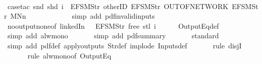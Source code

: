 \begin{isabellebody}
\ \ \ \ \isamarkupfalse%
\ {\isacharparenleft}case{\isacharunderscore}tac\ {\isachardoublequoteopen}{\isacharparenleft}snd\ {\isacharparenleft}shd\ i{\isacharparenright}{\isacharparenright}\ {\isacharequal}\ {\isacharbrackleft}EFSM{\isachardot}Str\ {\isacharprime}{\isacharprime}otherID{\isacharprime}{\isacharprime}{\isacharcomma}\ EFSM{\isachardot}Str\ {\isacharprime}{\isacharprime}OUT{\isacharunderscore}OF{\isacharunderscore}NETWORK{\isacharprime}{\isacharprime}{\isacharcomma}\ EFSM{\isachardot}Str\ {\isacharprime}{\isacharprime}MNn{}{\isacharprime}{\isacharprime}{\isacharbrackright}{\isachardoublequoteclose}{\isacharparenright}\isanewline
\ \ \ \ \ \isamarkupfalse%
\isanewline
\ \ \ \ \ \isamarkupfalse%
\ {\isacharparenleft}simp\ add{\isacharcolon}\ pdf{\isacharunderscore}{}{\isacharunderscore}invalid{\isacharunderscore}inputs{\isacharparenright}\isanewline
\ \ \ \ \isamarkupfalse%
\ no{\isacharunderscore}output{\isacharunderscore}none{\isacharbrackleft}of\ linkedIn\ {\isachardoublequoteopen}{\isacharparenleft}{\isacharless}{\isachargreater}{\isacharparenleft}{}\ {\isacharcolon}{\isacharequal}\ EFSM{\isachardot}Str\ {\isacharprime}{\isacharprime}free{\isacharprime}{\isacharprime}{\isacharparenright}{\isacharparenright}{\isachardoublequoteclose}\ {\isachardoublequoteopen}{\isacharparenleft}stl\ i{\isacharparenright}{\isachardoublequoteclose}{\isacharbrackright}\isanewline
\ \ \ \ \isamarkupfalse%
\ OutputEq{\isacharunderscore}def\isanewline
\ \ \ \ \ \isamarkupfalse%
\ {\isacharparenleft}simp\ add{\isacharcolon}\ alw{\isacharunderscore}mono{\isacharparenright}\isanewline
\ \ \ \ \ \isamarkupfalse%
\ {\isacharparenleft}simp\ add{\isacharcolon}\ pdf{\isacharunderscore}summary{\isacharparenright}\isanewline
\ \ \ \ \ \isamarkupfalse%
\ standard\isanewline
\ \ \ \ \ \isamarkupfalse%
\ {\isacharparenleft}simp\ add{\isacharcolon}\ pdf{}{\isacharunderscore}def\ apply{\isacharunderscore}outputs\ Str{\isacharunderscore}def\ implode\ Inputs{\isacharunderscore}def{\isacharparenright}\isanewline
\ \ \ \ \ \isamarkupfalse%
\ {\isacharparenleft}rule\ disjI{}{\isacharparenright}\isanewline
\ \ \ \ \ \isamarkupfalse%
\ {\isacharparenleft}rule\ alw{\isacharunderscore}mono{\isacharbrackleft}of\ {\isachardoublequoteopen}OutputEq\ {\isacharbrackleft}{\isacharbrackright}{\isachardoublequoteclose}{\isacharbrackright}{\isacharparenright}\isanewline

\end{isabellebody}
